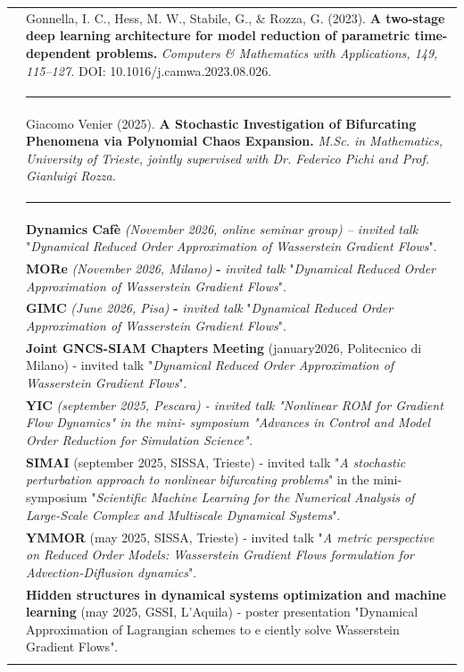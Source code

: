 \documentclass[a4paper]{article}
\newlength{\cvlabelwidth}\setlength{\cvlabelwidth}{88.8bp}
\newlength{\colgap}\setlength{\colgap}{9.5bp}
\newlength{\detailwidth}\setlength{\detailwidth}{\dimexpr\textwidth-\cvlabelwidth-\colgap\relax}
\newlength{\narrowwidth}\setlength{\narrowwidth}{\detailwidth}
\newlength{\cvitemsep}\setlength{\cvitemsep}{4.5bp}
\newcommand{\cvrowend}{\\\noalign{\vskip\cvitemsep}}
\newcommand{\cvbold}[1]{\textbf{\upshape #1}}
\newcommand{\cvlabel}[1]{\leavevmode{\color{cvblue}\upshape\bfseries\fontsize{8.5bp}{10.2bp}\selectfont\strut #1}}
\newcommand{\cvdivider}{\noalign{\vskip 6bp}%
 {\color{cvblue!20}\rule{\cvlabelwidth}{0.6bp}} &
 {\color{cvblue!20}\rule{\narrowwidth}{0.6bp}}\\*[4bp]}
\newcommand{\cvitem}[2]{\cvlabel{#1} & #2\cvrowend}
\newcommand{\cvpublication}[2]{\cvlabel{#1} &
 #2\cvrowend}
\begin{document}
\begin{longtable}{@{}>{\raggedright\arraybackslash}p{\cvlabelwidth}@{\hspace{\colgap}}>{\raggedright\arraybackslash}p{\detailwidth}@{}}
\cvpublication{}{Gonnella, I. C., Hess, M. W., Stabile, G., \& Rozza, G. (2023). \cvbold{A two-stage deep learning architecture for model reduction of parametric time-dependent problems.} \textit{Computers \& Mathematics with Applications, 149, 115–127.} DOI: 10.1016/j.camwa.2023.08.026.}

\cvdivider

\cvpublication{THESIS CO-\newline SUPERVISION}{Giacomo Venier (2025). \cvbold{A Stochastic Investigation of Bifurcating Phenomena via Polynomial Chaos Expansion.} \textit{M.Sc. in Mathematics, University of Trieste, jointly supervised with Dr. Federico Pichi and Prof. Gianluigi Rozza.}}

\cvdivider

\cvitem{PRESENTATIONS}{\cvbold{Dynamics Cafè }\textit{(November 2026, online seminar group) – invited talk }"\textit{Dynamical Reduced Order Approximation of Wasserstein Gradient Flows}".}

\cvitem{}{\cvbold{MORe }\textit{(November 2026, Milano)}\cvbold{\textit{ }}\cvbold{- }\textit{invited talk}\cvbold{ }"\textit{Dynamical Reduced Order Approximation of Wasserstein Gradient Flows}".}

\cvitem{}{\cvbold{GIMC }\textit{(June 2026, Pisa)}\cvbold{\textit{ }}\cvbold{- }\textit{invited talk}\cvbold{ }"\textit{Dynamical Reduced Order Approximation of Wasserstein Gradient Flows}".}

\cvitem{}{\cvbold{Joint GNCS-SIAM Chapters Meeting }(january2026, Politecnico di Milano) - invited talk "\textit{Dynamical Reduced Order Approximation of Wasserstein Gradient Flows}".}

\cvitem{}{\cvbold{YIC }\textit{(september 2025, Pescara) - invited talk "Nonlinear ROM for Gradient Flow Dynamics" in the mini- symposium "Advances in Control and Model Order Reduction for Simulation Science".}}

\cvitem{}{\cvbold{SIMAI }(september 2025, SISSA, Trieste) - invited talk "\textit{A stochastic perturbation approach to nonlinear bifurcating problems}" in the mini-symposium "\textit{Scientific Machine Learning for the Numerical Analysis of Large-Scale Complex and Multiscale Dynamical Systems}".}

\cvitem{}{\cvbold{YMMOR }(may 2025, SISSA, Trieste) - invited talk "\textit{A metric perspective on Reduced Order Models: Wasserstein Gradient Flows formulation for Advection-Diflusion dynamics}".}

\cvitem{}{\cvbold{Hidden structures in dynamical systems optimization and machine learning }(may 2025, GSSI, L'Aquila) - poster presentation "Dynamical Approximation of Lagrangian schemes to e ciently solve Wasserstein Gradient Flows".}


\end{longtable}
\end{document}

